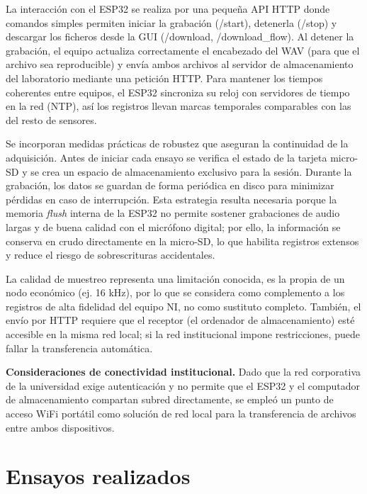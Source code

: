 \documentclass[12pt, letterpaper]{report}
\begin{document}
La interacción con el ESP32 se realiza por una pequeña API HTTP donde comandos simples permiten iniciar la grabación (/start), detenerla (/stop) y descargar los ficheros desde la GUI (/download, /download\_flow). Al detener la grabación, el equipo actualiza correctamente el encabezado del WAV (para que el archivo sea reproducible) y envía ambos archivos al servidor de almacenamiento del laboratorio mediante una petición HTTP. Para mantener los tiempos coherentes entre equipos, el ESP32 sincroniza su reloj con servidores de tiempo en la red (NTP), así los registros llevan marcas temporales comparables con las del resto de sensores.

Se incorporan medidas prácticas de robustez que aseguran la continuidad de la adquisición. Antes de iniciar cada ensayo se verifica el estado de la tarjeta micro-SD y se crea un espacio de almacenamiento exclusivo para la sesión. Durante la grabación, los datos se guardan de forma periódica en disco para minimizar pérdidas en caso de interrupción. Esta estrategia resulta necesaria porque la memoria \textit{flush} interna de la ESP32 no permite sostener grabaciones de audio largas y de buena calidad con el micrófono digital; por ello, la información se conserva en crudo directamente en la micro-SD, lo que habilita registros extensos y reduce el riesgo de sobrescrituras accidentales.

La calidad de muestreo representa una limitación conocida, es la propia de un nodo económico (ej. 16 kHz), por lo que se considera como complemento a los registros de alta fidelidad del equipo NI, no como sustituto completo. También, el envío por HTTP requiere que el receptor (el ordenador de almacenamiento) esté accesible en la misma red local; si la red institucional impone restricciones, puede fallar la transferencia automática.

\textbf{Consideraciones de conectividad institucional.} Dado que la red corporativa de la universidad exige autenticación y no permite que el ESP32 y el computador de almacenamiento compartan subred directamente, se empleó un punto de acceso WiFi portátil como solución de red local para la transferencia de archivos entre ambos dispositivos.

\clearpage
\chapter{Ensayos realizados}
\end{document}
